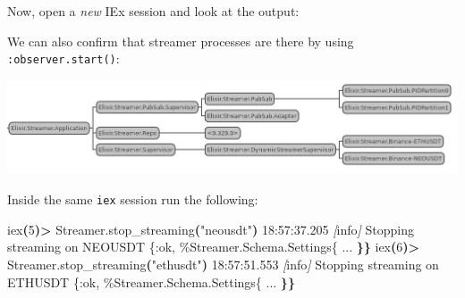 \documentclass[
  oneside]{book}
\newenvironment{Shaded}{\begin{snugshade}}{\end{snugshade}}
\newcommand{\AttributeTok}[1]{\textcolor[rgb]{0.13,0.29,0.53}{#1}}
\newcommand{\ErrorTok}[1]{\textcolor[rgb]{0.64,0.00,0.00}{\textbf{#1}}}
\newcommand{\ExtensionTok}[1]{#1}
\newcommand{\KeywordTok}[1]{\textcolor[rgb]{0.13,0.29,0.53}{\textbf{#1}}}
\newcommand{\NormalTok}[1]{#1}
\newcommand{\OperatorTok}[1]{\textcolor[rgb]{0.81,0.36,0.00}{\textbf{#1}}}
\newcommand{\PreprocessorTok}[1]{\textcolor[rgb]{0.56,0.35,0.01}{\textit{#1}}}
\newcommand{\SpecialStringTok}[1]{\textcolor[rgb]{0.31,0.60,0.02}{#1}}
\newcommand{\StringTok}[1]{\textcolor[rgb]{0.31,0.60,0.02}{#1}}
\begin{document}
Now, open a \emph{new} IEx session and look at the output:

\begin{Shaded}
\end{Shaded}

We can also confirm that streamer processes are there by using \texttt{:observer.start()}:

\begin{center}\includegraphics[width=1\linewidth]{images/chapter_11_05_finished_tree} \end{center}

Inside the same \texttt{iex} session run the following:

\begin{Shaded}
\begin{Highlighting}[]
\ExtensionTok{iex}\ErrorTok{(}\ExtensionTok{5}\KeywordTok{)}\OperatorTok{\textgreater{}}\NormalTok{ Streamer.stop\_streaming}\KeywordTok{(}\StringTok{"neousdt"}\KeywordTok{)} 
\ExtensionTok{18:57:37.205} \PreprocessorTok{[}\SpecialStringTok{info}\PreprocessorTok{]}\NormalTok{  Stopping streaming on NEOUSDT}
\ExtensionTok{\{:ok,}
 \ExtensionTok{\%Streamer.Schema.Settings\{}
   \ExtensionTok{...}
 \ErrorTok{\}\}}
\ExtensionTok{iex}\ErrorTok{(}\ExtensionTok{6}\KeywordTok{)}\OperatorTok{\textgreater{}}\NormalTok{ Streamer.stop\_streaming}\KeywordTok{(}\StringTok{"ethusdt"}\KeywordTok{)}
\ExtensionTok{18:57:51.553} \PreprocessorTok{[}\SpecialStringTok{info}\PreprocessorTok{]}\NormalTok{  Stopping streaming on ETHUSDT}
\ExtensionTok{\{:ok,}
 \ExtensionTok{\%Streamer.Schema.Settings\{}
   \ExtensionTok{...}
 \ErrorTok{\}\}}
\end{Highlighting}
\end{Shaded}
\end{document}
